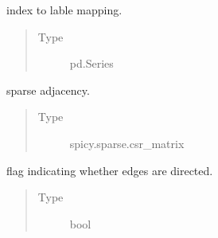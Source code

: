 \documentclass[letterpaper,10pt,english]{sphinxmanual}
\begin{document}
\begin{fulllineitems}
\begin{fulllineitems}
\label{\detokenize{_modules/cosifer.collections:cosifer.collections.graph.Graph.indices_to_labels}}
index to lable mapping.
\begin{quote}\begin{description}
\item[{Type}] \leavevmode
pd.Series

\end{description}\end{quote}

\end{fulllineitems}


\begin{fulllineitems}
\label{\detokenize{_modules/cosifer.collections:cosifer.collections.graph.Graph.adjacency}}
sparse adjacency.
\begin{quote}\begin{description}
\item[{Type}] \leavevmode
spicy.sparse.csr\_matrix

\end{description}\end{quote}

\end{fulllineitems}


\begin{fulllineitems}
\label{\detokenize{_modules/cosifer.collections:cosifer.collections.graph.Graph.undirected}}
flag indicating whether edges are directed.
\begin{quote}\begin{description}
\item[{Type}] \leavevmode
bool

\end{description}\end{quote}

\end{fulllineitems}



\end{fulllineitems}
\end{document}
